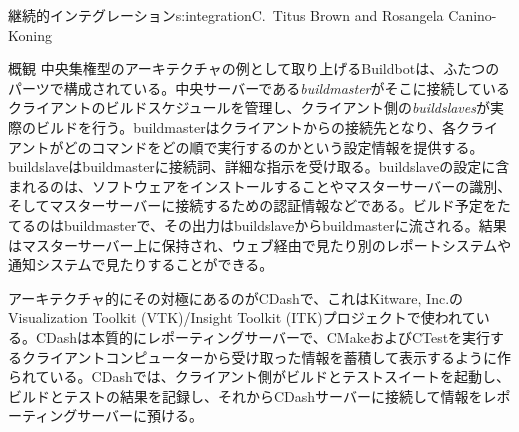 \begin{aosachapter}{継続的インテグレーション}{s:integration}{C.\ Titus Brown and Rosangela Canino-Koning}
\begin{aosasect1}{概観}
中央集権型のアーキテクチャの例として取り上げるBuildbotは、ふたつのパーツで構成されている。中央サーバーである\emph{buildmaster}がそこに接続しているクライアントのビルドスケジュールを管理し、クライアント側の\emph{buildslaves}が実際のビルドを行う。buildmasterはクライアントからの接続先となり、各クライアントがどのコマンドをどの順で実行するのかという設定情報を提供する。buildslaveはbuildmasterに接続詞、詳細な指示を受け取る。buildslaveの設定に含まれるのは、ソフトウェアをインストールすることやマスターサーバーの識別、そしてマスターサーバーに接続するための認証情報などである。ビルド予定をたてるのはbuildmasterで、その出力はbuildslaveからbuildmasterに流される。結果はマスターサーバー上に保持され、ウェブ経由で見たり別のレポートシステムや通知システムで見たりすることができる。

アーキテクチャ的にその対極にあるのがCDashで、これはKitware, Inc.のVisualization Toolkit (VTK)/Insight Toolkit (ITK)プロジェクトで使われている。CDashは本質的にレポーティングサーバーで、CMakeおよびCTestを実行するクライアントコンピューターから受け取った情報を蓄積して表示するように作られている。CDashでは、クライアント側がビルドとテストスイートを起動し、ビルドとテストの結果を記録し、それからCDashサーバーに接続して情報をレポーティングサーバーに預ける。


\end{aosasect1}
\end{aosachapter}
